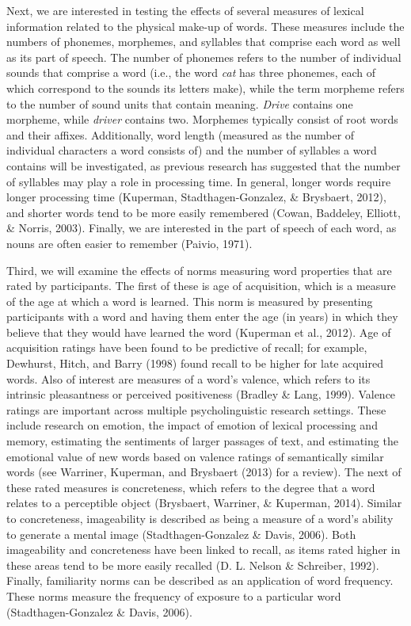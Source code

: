 \documentclass[english,man]{apa6}
\theoremstyle{definition}
\theoremstyle{definition}
\theoremstyle{definition}
\theoremstyle{remark}
\begin{document}
Next, we are interested in testing the effects of several measures of
lexical information related to the physical make-up of words. These
measures include the numbers of phonemes, morphemes, and syllables that
comprise each word as well as its part of speech. The number of phonemes
refers to the number of individual sounds that comprise a word (i.e.,
the word \emph{cat} has three phonemes, each of which correspond to the
sounds its letters make), while the term morpheme refers to the number
of sound units that contain meaning. \emph{Drive} contains one morpheme,
while \emph{driver} contains two. Morphemes typically consist of root
words and their affixes. Additionally, word length (measured as the
number of individual characters a word consists of) and the number of
syllables a word contains will be investigated, as previous research has
suggested that the number of syllables may play a role in processing
time. In general, longer words require longer processing time (Kuperman,
Stadthagen-Gonzalez, \& Brysbaert, 2012), and shorter words tend to be
more easily remembered (Cowan, Baddeley, Elliott, \& Norris, 2003).
Finally, we are interested in the part of speech of each word, as nouns
are often easier to remember (Paivio, 1971).

Third, we will examine the effects of norms measuring word properties
that are rated by participants. The first of these is age of
acquisition, which is a measure of the age at which a word is learned.
This norm is measured by presenting participants with a word and having
them enter the age (in years) in which they believe that they would have
learned the word (Kuperman et al., 2012). Age of acquisition ratings
have been found to be predictive of recall; for example, Dewhurst,
Hitch, and Barry (1998) found recall to be higher for late acquired
words. Also of interest are measures of a word's valence, which refers
to its intrinsic pleasantness or perceived positiveness (Bradley \&
Lang, 1999). Valence ratings are important across multiple
psycholinguistic research settings. These include research on emotion,
the impact of emotion of lexical processing and memory, estimating the
sentiments of larger passages of text, and estimating the emotional
value of new words based on valence ratings of semantically similar
words (see Warriner, Kuperman, and Brysbaert (2013) for a review). The
next of these rated measures is concreteness, which refers to the degree
that a word relates to a perceptible object (Brysbaert, Warriner, \&
Kuperman, 2014). Similar to concreteness, imageability is described as
being a measure of a word's ability to generate a mental image
(Stadthagen-Gonzalez \& Davis, 2006). Both imageability and concreteness
have been linked to recall, as items rated higher in these areas tend to
be more easily recalled (D. L. Nelson \& Schreiber, 1992). Finally,
familiarity norms can be described as an application of word frequency.
These norms measure the frequency of exposure to a particular word
(Stadthagen-Gonzalez \& Davis, 2006).
\end{document}
